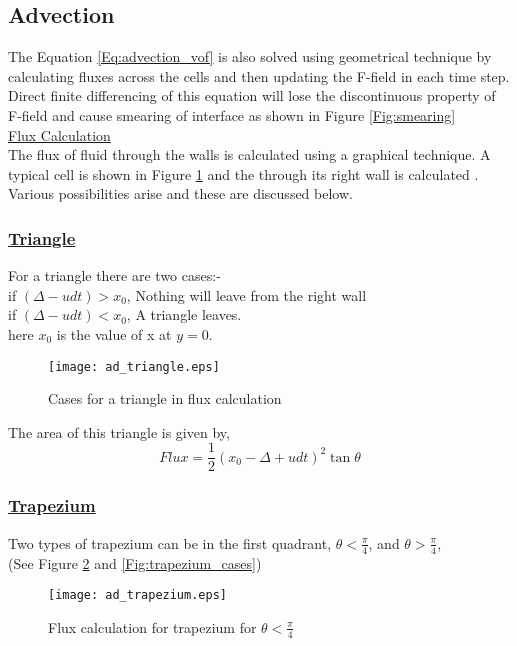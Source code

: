 \subsection{Advection}
The Equation \ref{Eq:advection_vof} is also solved using geometrical technique by calculating fluxes across the cells and then updating the F-field in each time step. Direct finite differencing
of this equation will lose the discontinuous property of F-field and cause smearing of interface as shown in Figure \ref{Fig:smearing}\\
% 
\underline{Flux Calculation}\\
The flux of fluid through the walls is calculated using a graphical technique. A typical cell is shown in Figure \ref{Fig:triangle_t} and the through its right wall is calculated .
Various possibilities arise and these are discussed below.
\subsubsection{\underline{Triangle}}
For a triangle there are two cases:-\\
if $(\Delta-udt)>x_0$, Nothing will leave from the right wall \\
if $(\Delta-udt)<x_0$, A triangle leaves. \\
here $x_0$ is the value of x at $y=0$.
\begin{figure}%
 \centering
 \texttt{[image: ad\_triangle.eps]}
 \caption{Cases for a triangle in flux calculation}
 \label{Fig:triangle_t}
\end{figure}
The area of this triangle is given by,
\begin{equation*}
 \boxed{Flux = \frac{1}{2}(x_0 - \Delta + udt)^2 \tan\theta}
\end{equation*}

\subsubsection{\underline{Trapezium}}
Two types of trapezium can be in the first quadrant, $\theta<\frac{\pi}{4}$, and $\theta>\frac{\pi}{4}$, \\
(See Figure \ref{Fig:trapezium} and \ref{Fig:trapezium_cases}) \\
\begin{figure}%
\centering
 \texttt{[image: ad\_trapezium.eps]}
 \caption{Flux calculation for trapezium for $\theta<\frac{\pi}{4}$}
 \label{Fig:trapezium}
\end{figure}

